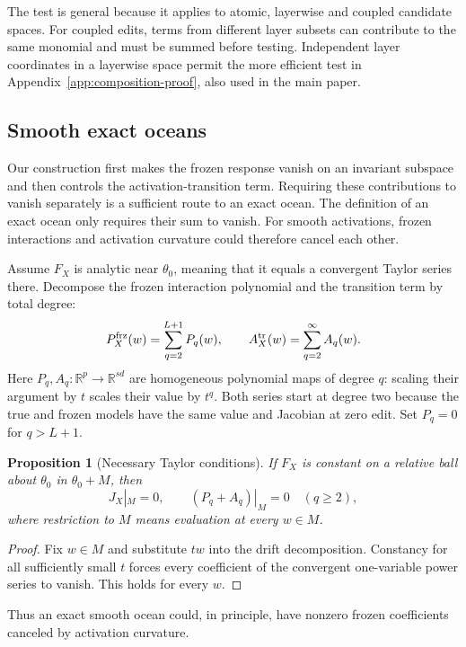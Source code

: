\documentclass[twoside]{article}
\newtheorem{proposition}[theorem]{Proposition}
\theoremstyle{remark}
\newcommand{\R}{\mathbb R}
\newcommand{\frz}{\mathrm{frz}}
\theoremstyle{highlightdefinition}
\theoremstyle{remark}
\begin{document}
The test is general because it applies to atomic, layerwise and coupled candidate spaces. For coupled edits, terms from different layer subsets can contribute to the same monomial and must be summed before testing. Independent layer coordinates in a layerwise space permit the more efficient test in Appendix~\ref{app:composition-proof}, also used in the main paper.

\subsection{Smooth exact oceans}\label{app:smooth-exact}
Our construction first makes the frozen response vanish on an invariant subspace and then controls the activation-transition term. Requiring these contributions to vanish separately is a sufficient route to an exact ocean. The definition of an exact ocean only requires their sum to vanish. For smooth activations, frozen interactions and activation curvature could therefore cancel each other.

Assume $F_X$ is analytic near $\theta_0$, meaning that it equals a convergent Taylor series there. Decompose the frozen interaction polynomial and the transition term by total degree:
\[
 P_X^{\frz}(w)=\sum_{q=2}^{L+1}P_q(w),\qquad
 A_X^{\rm tr}(w)=\sum_{q=2}^{\infty}A_q(w).
\]
Here $P_q,A_q:\R^p\to\R^{sd}$ are homogeneous polynomial maps of degree $q$: scaling their argument by $t$ scales their value by $t^q$. Both series start at degree two because the true and frozen models have the same value and Jacobian at zero edit. Set $P_q=0$ for $q>L+1$.

\begin{proposition}[Necessary Taylor conditions]
If $F_X$ is constant on a relative ball about $\theta_0$ in $\theta_0+M$, then
\[
 J_X|_M=0,\qquad (P_q+A_q)|_M=0\quad(q\ge2),
\]
where restriction to $M$ means evaluation at every $w\in M$.
\end{proposition}
\begin{proof}
Fix $w\in M$ and substitute $tw$ into the drift decomposition. Constancy for all sufficiently small $t$ forces every coefficient of the convergent one-variable power series to vanish. This holds for every $w$.
\end{proof}
Thus an exact smooth ocean could, in principle, have nonzero frozen coefficients canceled by activation curvature.
\end{document}
